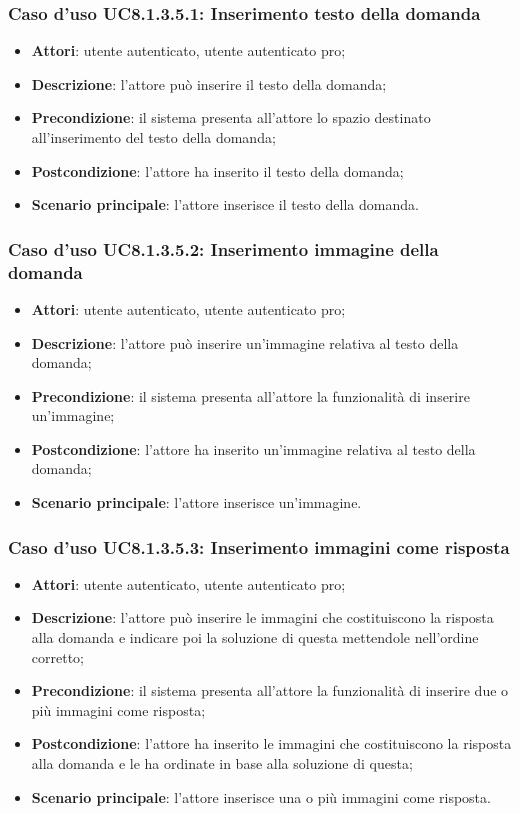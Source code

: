 \subsubsection{Caso d'uso UC8.1.3.5.1: Inserimento testo della domanda}
\begin{itemize}
	\item\textbf{Attori}: utente autenticato, utente autenticato pro;
	\item\textbf{Descrizione}: l'attore può inserire il testo della domanda;
	\item\textbf{Precondizione}: il sistema presenta all'attore lo spazio destinato all'inserimento del testo della domanda;
	\item \textbf{Postcondizione}: l'attore ha inserito il testo della domanda;
	\item\textbf{Scenario principale}: l'attore inserisce il testo della domanda. 
\end{itemize}

\subsubsection{Caso d'uso UC8.1.3.5.2: Inserimento immagine della domanda}
\begin{itemize}
	\item\textbf{Attori}: utente autenticato, utente autenticato pro;
	\item\textbf{Descrizione}: l'attore può inserire un'immagine relativa al testo della domanda;
	\item\textbf{Precondizione}: il sistema presenta all'attore la funzionalità di inserire un'immagine;
	\item \textbf{Postcondizione}: l'attore ha inserito un'immagine relativa al testo della domanda;
	\item\textbf{Scenario principale}: l'attore inserisce un'immagine.
\end{itemize}

\subsubsection{Caso d'uso UC8.1.3.5.3: Inserimento immagini come risposta}
\begin{itemize}
	\item\textbf{Attori}: utente autenticato, utente autenticato pro;
	\item\textbf{Descrizione}: l'attore può inserire le immagini che costituiscono la risposta alla domanda e indicare poi la soluzione di questa mettendole nell'ordine corretto;
	\item\textbf{Precondizione}: il sistema presenta all'attore la funzionalità di inserire due o più immagini come risposta; 
	\item \textbf{Postcondizione}: l'attore ha inserito le immagini che costituiscono la risposta alla domanda e le ha ordinate in base alla soluzione di questa;
	\item\textbf{Scenario principale}: l'attore inserisce una o più immagini come risposta.
\end{itemize}

